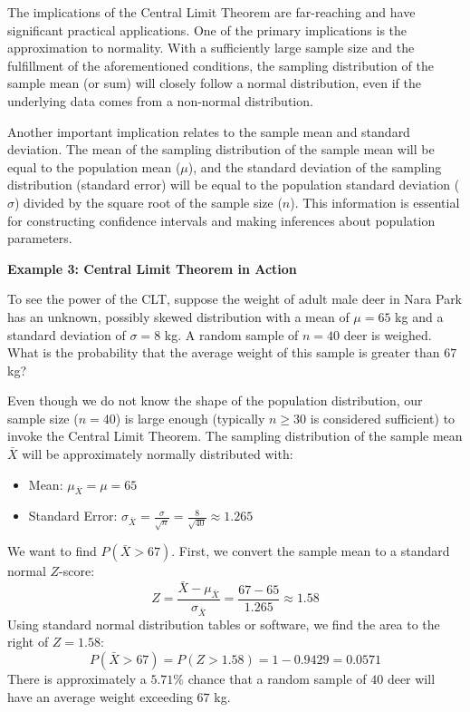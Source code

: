 \documentclass{article}
\begin{document}
The implications of the Central Limit Theorem are far-reaching and have significant practical applications. One of the primary implications is the approximation to normality. With a sufficiently large sample size and the fulfillment of the aforementioned conditions, the sampling distribution of the sample mean (or sum) will closely follow a normal distribution, even if the underlying data comes from a non-normal distribution.

Another important implication relates to the sample mean and standard deviation. The mean of the sampling distribution of the sample mean will be equal to the population mean ($\mu$), and the standard deviation of the sampling distribution (standard error) will be equal to the population standard deviation ($\sigma$) divided by the square root of the sample size ($n$). This information is essential for constructing confidence intervals and making inferences about population parameters.

\textbf{Example 3: Central Limit Theorem in Action}

To see the power of the CLT, suppose the weight of adult male deer in Nara Park has an unknown, possibly skewed distribution with a mean of $\mu=65$ kg and a standard deviation of $\sigma=8$ kg. A random sample of $n=40$ deer is weighed. What is the probability that the average weight of this sample is greater than $67$ kg?

Even though we do not know the shape of the population distribution, our sample size ($n=40$) is large enough (typically $n\geq30$ is considered sufficient) to invoke the Central Limit Theorem. The sampling distribution of the sample mean $\bar{X}$ will be approximately normally distributed with:

\begin{itemize}
\item Mean: $\mu_{\bar{X}}=\mu=65$
\item Standard Error: $\sigma_{\bar{X}}=\frac{\sigma}{\sqrt{n}}=\frac{8}{\sqrt{40}}\approx1.265$
\end{itemize}

We want to find $P(\bar{X}>67)$. First, we convert the sample mean to a standard normal $Z$-score:
$$Z=\frac{\bar{X}-\mu_{\bar{X}}}{\sigma_{\bar{X}}}=\frac{67-65}{1.265}\approx1.58$$
Using standard normal distribution tables or software, we find the area to the right of $Z=1.58$:
$$P(\bar{X}>67)=P(Z>1.58)=1-0.9429=0.0571$$
There is approximately a $5.71\%$ chance that a random sample of $40$ deer will have an average weight exceeding $67$ kg.
\end{document}
